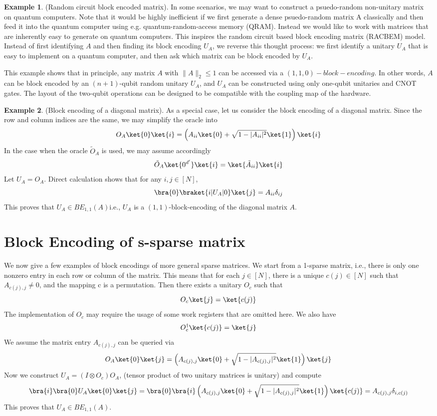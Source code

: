 \documentclass[12pt, oneside]{book}
\theoremstyle{definition}
\theoremstyle{definition}
\newtheorem{example}{Example}[section]
\theoremstyle{remark}
\begin{document}
\begin{example}
    (Random circuit block encoded matrix). In some scenarios, we may want to construct a psuedo-random non-unitary matrix on quantum computers. Note that it would be highly inefficient if we first generate a dense psuedo-random matrix A classically and then feed it into the quantum computer using e.g. quantum-random-access memory (QRAM). Instead we would like to work with matrices that are inherently easy to generate on quantum computers. This inspires the random circuit based block encoding matrix (RACBEM) model. Instead of first identifying $A$ and then finding its block encoding $U_A$, we reverse this thought process: we first identify a unitary $U_A$ that is easy to implement on a quantum computer, and then ask which matrix can be block encoded by $U_A$.
\end{example}
This example shows that in principle, any matrix $A$ with $\|A\|_2\leq 1$ can be accessed via a $(1,1,0)-block-encoding.$ In other words, $A$ can be block encoded by an $(n+1)$-qubit random unitary $U_A$, and $U_A$ can be constructed using only one-qubit unitaries and CNOT gates. The layout of the two-qubit operations can be designed to be compatible with the coupling map of the hardware.

\begin{example}
    (Block encoding of a diagonal matrix). As a special case, let us consider the block encoding of a diagonal matrix. Since the row and column indices are the same, we may simplify the oracle into
    \[
    O_A\ket{0}\ket{i}=\left(A_{ii}\ket{0}+\sqrt{1-|A_{ii}|^2} \ket{1}\right)\ket{i}
    \]
    In the case when the oracle $\tilde{O}_A$ is used, we may assume accordingly
    \[
    \tilde{O}_A\ket{0^{d'}}\ket{i}=\ket{\tilde{A}_{ii}}\ket{i}
    \]
    Let $U_A=O_A$. Direct calculation shows that for any $i,j\in[N]$,
    \[
    \bra{0}\braket{i|U_A|0}\ket{j}=A_{ii}\delta_{ij}
    \]
    This proves that $U_A\in BE_{1,1}(A)$i.e., $U_A$ is a $(1,1)$-block-encoding of the diagonal matrix $A$.
\end{example}

\section{Block Encoding of s-sparse matrix}
We now give a few examples of block encodings of more general sparse matrices. We start from a 1-sparse matrix, i.e., there is only one nonzero entry in each row or column of the matrix. This means that for each $j\in[N]$, there is a unique $c(j)\in[N]$ such that $A_{c(j),j}\neq 0$, and the mapping c is a permutation. Then there exists a unitary $O_c$ such that
\[
O_c\ket{j}=\ket{c(j)}
\]
The implementation of $O_c$ may require the usage of some work registers that are omitted here. We also have
\[
O^{\dagger}_c\ket{c(j)}=\ket{j}
\]
We assume the matrix entry $A_{c(j),j}$ can be queried via
\[
O_A\ket{0}\ket{j}=\left(A_{c(j),j}\ket{0}+\sqrt{1-|A_{c(j),j}|^2}\ket{1}\right)\ket{j}
\]
Now we construct $U_A=(I\otimes O_c)O_A$, (tensor product of two unitary matrices is unitary) and compute
\[
\bra{i}\bra{0}U_A\ket{0}\ket{j}=\bra{0}\bra{i}\left(A_{c(j),j}\ket{0}+\sqrt{1-|A_{c(j),j}|^2}\ket{1}\right)\ket{c(j)}=A_{c(j),j}\delta_{i,c(j)}
\]
This proves that $U_A\in BE_{1,1}(A)$.
\end{document}
